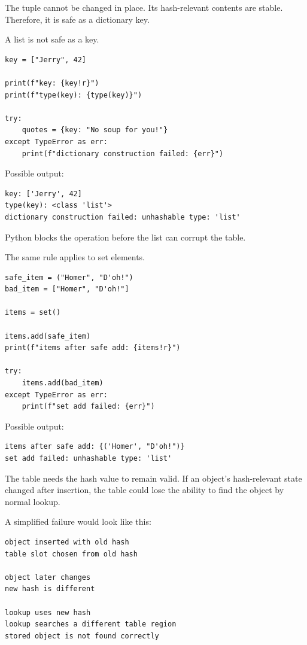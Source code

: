 The tuple cannot be changed in place. Its hash-relevant contents are stable. Therefore, it is safe as a dictionary key.

A list is not safe as a key.

\begin{verbatim}
key = ["Jerry", 42]

print(f"key: {key!r}")
print(f"type(key): {type(key)}")

try:
    quotes = {key: "No soup for you!"}
except TypeError as err:
    print(f"dictionary construction failed: {err}")
\end{verbatim}

Possible output:

\begin{verbatim}
key: ['Jerry', 42]
type(key): <class 'list'>
dictionary construction failed: unhashable type: 'list'
\end{verbatim}

Python blocks the operation before the list can corrupt the table.

The same rule applies to set elements.

\begin{verbatim}
safe_item = ("Homer", "D'oh!")
bad_item = ["Homer", "D'oh!"]

items = set()

items.add(safe_item)
print(f"items after safe add: {items!r}")

try:
    items.add(bad_item)
except TypeError as err:
    print(f"set add failed: {err}")
\end{verbatim}

Possible output:

\begin{verbatim}
items after safe add: {('Homer', "D'oh!")}
set add failed: unhashable type: 'list'
\end{verbatim}

The table needs the hash value to remain valid. If an object's hash-relevant state changed after insertion, the table could lose the ability to find the object by normal lookup.

A simplified failure would look like this:

\begin{verbatim}
object inserted with old hash
table slot chosen from old hash

object later changes
new hash is different

lookup uses new hash
lookup searches a different table region
stored object is not found correctly
\end{verbatim}


